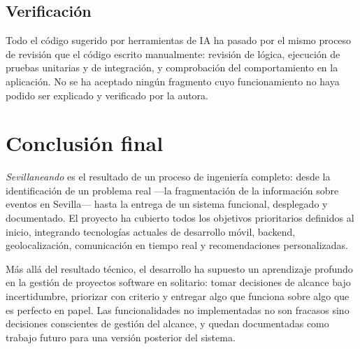 \subsection{Verificación}

Todo el código sugerido por herramientas de IA ha pasado por el mismo proceso de revisión que el código escrito manualmente: revisión de lógica, ejecución de pruebas unitarias y de integración, y comprobación del comportamiento en la aplicación. No se ha aceptado ningún fragmento cuyo funcionamiento no haya podido ser explicado y verificado por la autora.

\section{Conclusión final}

\textit{Sevillaneando} es el resultado de un proceso de ingeniería completo: desde la identificación de un problema real ---la fragmentación de la información sobre eventos en Sevilla--- hasta la entrega de un sistema funcional, desplegado y documentado. El proyecto ha cubierto todos los objetivos prioritarios definidos al inicio, integrando tecnologías actuales de desarrollo móvil, backend, geolocalización, comunicación en tiempo real y recomendaciones personalizadas.

Más allá del resultado técnico, el desarrollo ha supuesto un aprendizaje profundo en la gestión de proyectos software en solitario: tomar decisiones de alcance bajo incertidumbre, priorizar con criterio y entregar algo que funciona sobre algo que es perfecto en papel. Las funcionalidades no implementadas no son fracasos sino decisiones conscientes de gestión del alcance, y quedan documentadas como trabajo futuro para una versión posterior del sistema.
